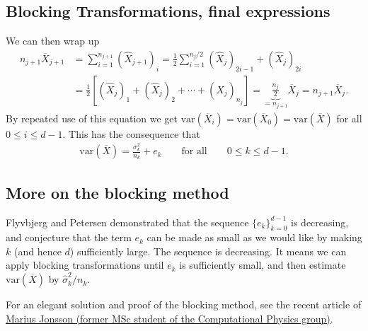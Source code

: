 \documentclass[%
oneside,                 %
final,                   %
10pt]{article}
\begin{document}
\subsection*{Blocking Transformations, final expressions}

We can then wrap up
\begin{align}
n_{j+1} \overline{X}_{j+1}  &= \sum_{i=1}^{n_{j+1}} (\hat{X}_{j+1})_i =  \frac{1}{2}\sum_{i=1}^{n_{j}/2} (\hat{X}_{j})_{2i-1} + (\hat{X}_{j})_{2i} \nonumber \\
&= \frac{1}{2}\left[ (\hat{X}_j)_1 + (\hat{X}_j)_2 + \cdots + (\hat{X}_j)_{n_j} \right] = \underbrace{\frac{n_j}{2}}_{=n_{j+1}} \overline{X}_j = n_{j+1}\overline{X}_j. 
\end{align}
By repeated use of this equation we get $\mathrm{var}(\overline{X}_i) = \mathrm{var}(\overline{X}_0) = \mathrm{var}(\overline{X})$ for all $0 \leq i \leq d-1$. This has the consequence that
\begin{align}
\mathrm{var}(\overline{X}) = \frac{\sigma_k^2}{n_k} + e_k \qquad \text{for all} \qquad 0 \leq k \leq d-1. \label{eq:convergence}
\end{align}

\subsection*{More on the blocking method}

Flyvbjerg and Petersen demonstrated that the sequence
$\{e_k\}_{k=0}^{d-1}$ is decreasing, and conjecture that the term
$e_k$ can be made as small as we would like by making $k$ (and hence
$d$) sufficiently large. The sequence is decreasing.
It means we can apply blocking transformations until
$e_k$ is sufficiently small, and then estimate $\mathrm{var}(\overline{X})$ by
$\widehat{\sigma}^2_k/n_k$. 

For an elegant solution and proof of the blocking method, see the recent article of \href{{https://journals.aps.org/pre/abstract/10.1103/PhysRevE.98.043304}}{Marius Jonsson (former MSc student of the Computational Physics group)}.

\end{document}
